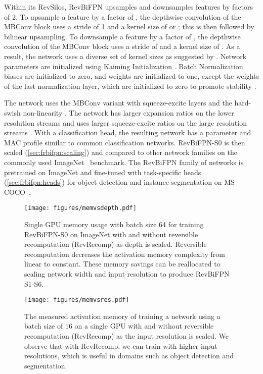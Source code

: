 \documentclass{article}
\begin{document}
Within its RevSilos, RevBiFPN upsamples and downsamples features by factors of 2.
To upsample a feature by a factor of , the depthwise convolution of the MBConv block uses a stride of 1 and a kernel size of  or ;
this is then followed by bilinear upsampling.
To downsample a feature by a factor of , the depthwise convolution of the MBConv block uses a stride of  and a kernel size of .
As a result, the network uses a diverse set of kernel sizes as suggested by \citet{tan2019mnasnet}.
Network parameters are initialized using Kaiming Initialization \cite{he2015delving}.
Batch Normalization biases are initialized to zero, and weights are initialized to one, except the weights of the last normalization layer, which are initialized to zero to promote stability \cite{kingma2018glow}.

The network uses the MBConv variant with squeeze-excite layers \cite{tan2019efficientnet} and the hard-swish non-linearity \cite{howard2019searchingmbconv}.
The network has larger expansion ratios on the lower resolution streams and uses larger squeeze-excite ratios on the large resolution streams \cite{ridnik2020tresnet}.
With a classification head, the resulting network has a parameter and MAC profile similar to common classification networks.
RevBiFPN-S0 is then scaled (\cref{sec:frbifpn:scaling}) and compared to other network families on the commonly used ImageNet~\cite{deng2009imagenet} benchmark.
The RevBiFPN family of networks is pretrained on ImageNet and fine-tuned with task-specific heads (\cref{sec:frbifpn:heads}) for object detection and instance segmentation on MS COCO~\cite{lin2014microsoft}.




\begin{figure*}
    \begin{minipage}{0.48\linewidth}
    \centering
    \texttt{[image: figures/memvsdepth.pdf]}
    \vskip -5pt
    \caption{
        Single GPU memory usage with batch size 64 for training RevBiFPN-S0 on ImageNet with and without reversible recomputation (RevRecomp) as depth is scaled.
        Reversible recomputation decreases the activation memory complexity from linear to constant.
        These memory savings can be reallocated to scaling network width and input resolution to produce RevBiFPN S1-S6.}
    \label{fig:mvd}
    \end{minipage}
    \hfill
    \begin{minipage}{0.48\linewidth}
    \centering
    \texttt{[image: figures/memvsres.pdf]}
    \vskip -5pt
    \caption{
        The measured activation memory of training a network using a batch size of 16 on a single GPU with and without reversible recomputation (RevRecomp) as the input resolution is scaled. We observe that with RevRecomp, we can train with higher input resolutions, which is useful in domains such as object detection and segmentation.}
    \label{fig:mvr}
    \end{minipage}
    \vskip -7pt
\end{figure*}
\end{document}
